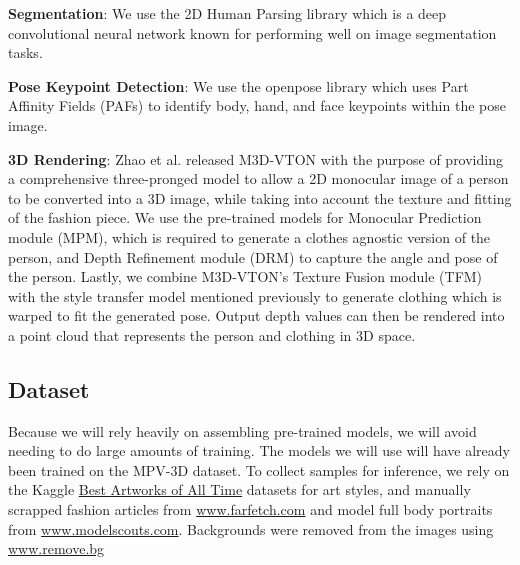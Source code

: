 \documentclass{article}
\begin{document}
\textbf{Segmentation}: We use the 2D Human Parsing library\cite{2dhumanparsing} which is a deep convolutional neural network known for performing well on image segmentation tasks\cite{2dsegmentation}.

\textbf{Pose Keypoint Detection}: We use the openpose\cite{openpose1}\cite{openpose2} library which uses Part Affinity Fields (PAFs) to identify body, hand, and face keypoints within the pose image.

\textbf{3D Rendering}: Zhao et al. released M3D-VTON\cite{m3dvton} with the purpose of providing a comprehensive three-pronged model to allow a 2D monocular image of a person to be converted into a 3D image, while taking into account the texture and fitting of the fashion piece. We use the pre-trained models for Monocular Prediction module (MPM), which is required to generate a clothes agnostic version of the person, and Depth Refinement module (DRM) to capture the angle and pose of the person. Lastly, we combine M3D-VTON's Texture Fusion module (TFM) with the style transfer model mentioned previously to generate clothing which is warped to fit the generated pose. Output depth values can then be rendered into a point cloud that represents the person and clothing in 3D space.

\subsection{Dataset}
Because we will rely heavily on assembling pre-trained models, we will avoid needing to do large amounts of training. The models we will use will have already been trained on the MPV-3D dataset\cite{dong2019data1}. To collect samples for inference, we rely on the Kaggle \href{https://www.kaggle.com/datasets/ikarus777/best-artworks-of-all-time}{Best Artworks of All Time} datasets for art styles, and manually scrapped fashion articles from \href{https://www.farfetch.com}{www.farfetch.com} and model full body portraits from \href{https://www.modelscouts.com}{www.modelscouts.com}. Backgrounds were removed from the images using \href{https://www.remove.bg/}{www.remove.bg}
\end{document}

